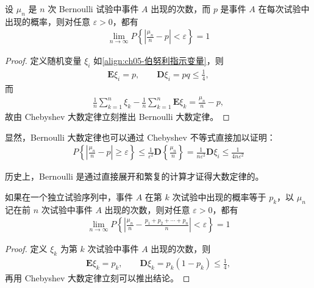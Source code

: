 \documentclass[../../main.tex]{subfiles}
\begin{document}
\begin{theorem}\label{theorem:ch05-Bernoulli大数定律}
设 $\mu_n$ 是 $n$ 次 Bernoulli 试验中事件 $A$ 出现的次数，而 $p$ 是事件 $A$ 在每次试验中出现的概率，则对任意 $\varepsilon>0$，都有
\begin{align}
\lim_{n\to\infty}P\!\left\{\left|\frac{\mu_n}{n}-p\right|<\varepsilon\right\}=1
\end{align}
\end{theorem}

\begin{proof}
定义随机变量 $\xi_i$ 如\cref{align:ch05-伯努利指示变量}，则
\begin{align*}
\boldsymbol{E}\xi_i=p,\qquad \boldsymbol{D}\xi_i=pq\leqslant\frac14,
\end{align*}
而
\begin{align*}
\frac1n\sum_{k=1}^{n}\xi_k-\frac1n\sum_{k=1}^{n}\boldsymbol{E}\xi_k=\frac{\mu_n}{n}-p,
\end{align*}
故由 Chebyshev 大数定律立刻推出 Bernoulli 大数定律。
\end{proof}

显然，Bernoulli 大数定律也可以通过 Chebyshev 不等式直接加以证明：
\begin{align}
P\!\left\{\left|\frac{\mu_n}{n}-p\right|\geqslant\varepsilon\right\}
\leqslant\frac{1}{\varepsilon^{2}}\boldsymbol{D}\!\left\{\frac{\mu_n}{n}\right\}
=\frac{1}{n\varepsilon^{2}}\boldsymbol{D}\xi_i
\leqslant\frac{1}{4n\varepsilon^{2}}
\end{align}

历史上，Bernoulli 是通过直接展开和繁复的计算才证得大数定律的。

\begin{theorem}\label{theorem:ch05-Poisson大数定律}
如果在一个独立试验序列中，事件 $A$ 在第 $k$ 次试验中出现的概率等于 $p_k$，以 $\mu_n$ 记在前 $n$ 次试验中事件 $A$ 出现的次数，则对任意 $\varepsilon>0$，都有
\begin{align}
\lim_{n\to\infty}P\!\left\{\left|\frac{\mu_n}{n}-\frac{p_1+p_2+\cdots+p_n}{n}\right|<\varepsilon\right\}=1
\end{align}
\end{theorem}

\begin{proof}
定义 $\xi_k$ 为第 $k$ 次试验中事件 $A$ 出现的次数，则
\begin{align*}
\boldsymbol{E}\xi_k=p_k,\qquad \boldsymbol{D}\xi_k=p_k(1-p_k)\leqslant\frac14,
\end{align*}
再用 Chebyshev 大数定律立刻可以推出结论。
\end{proof}
\end{document}
